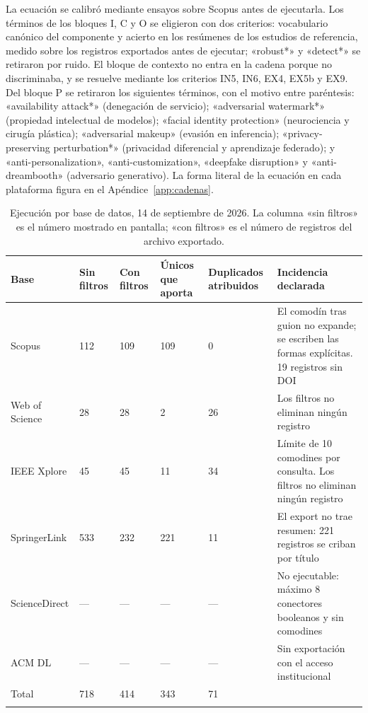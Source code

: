 \documentclass[pdflatex,sn-mathphys-num]{sn-jnl}
\theoremstyle{thmstyleone}
\theoremstyle{thmstyletwo}
\theoremstyle{thmstylethree}
\begin{document}
La ecuación se calibró mediante ensayos sobre Scopus antes de ejecutarla. Los términos de los bloques I, C y O se eligieron con dos criterios: vocabulario canónico del componente y acierto en los resúmenes de los estudios de referencia, medido sobre los registros exportados antes de ejecutar; «robust*» y «detect*» se retiraron por ruido. El bloque de contexto no entra en la cadena porque no discriminaba, y se resuelve mediante los criterios IN5, IN6, EX4, EX5b y EX9. Del bloque P se retiraron los siguientes términos, con el motivo entre paréntesis: «availability attack*» (denegación de servicio); «adversarial watermark*» (propiedad intelectual de modelos); «facial identity protection» (neurociencia y cirugía plástica); «adversarial makeup» (evasión en inferencia); «privacy-preserving perturbation*» (privacidad diferencial y aprendizaje federado); y «anti-personalization», «anti-customization», «deepfake disruption» y «anti-dreambooth» (adversario generativo). La forma literal de la ecuación en cada plataforma figura en el Apéndice~\ref{app:cadenas}.

\begin{table}[h]
\centering
\caption{Ejecución por base de datos, 14 de septiembre de 2026. La columna «sin filtros» es el número mostrado en pantalla; «con filtros» es el número de registros del archivo exportado.}\label{tab:bases}
\footnotesize
\begin{tabularx}{\textwidth}{@{}Y{1.05}Z{0.55}Z{0.55}Z{0.65}Z{0.7}Y{2.5}@{}}
\toprule
Base & Sin filtros & Con filtros & Únicos que aporta & Duplicados atribuidos & Incidencia declarada \\
\midrule
Scopus & 112 & 109 & 109 & 0 & El comodín tras guion no expande; se escriben las formas explícitas. 19 registros sin DOI \\
Web of Science & 28 & 28 & 2 & 26 & Los filtros no eliminan ningún registro \\
IEEE Xplore & 45 & 45 & 11 & 34 & Límite de 10 comodines por consulta. Los filtros no eliminan ningún registro \\
SpringerLink & 533 & 232 & 221 & 11 & El export no trae resumen: 221 registros se criban por título \\
ScienceDirect & --- & --- & --- & --- & No ejecutable: máximo 8 conectores booleanos y sin comodines \\
ACM DL & --- & --- & --- & --- & Sin exportación con el acceso institucional \\
\midrule
Total & 718 & 414 & 343 & 71 & \\
\botrule
\end{tabularx}
\end{table}
\end{document}
